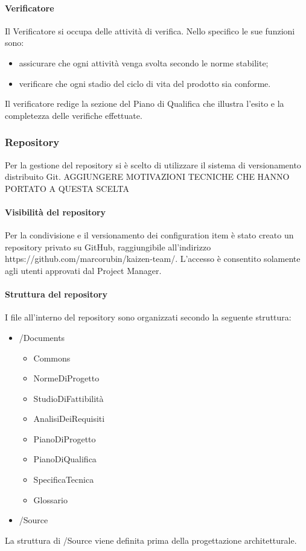 			\paragraph{Verificatore}
				Il Verificatore si occupa delle attività di verifica. Nello specifico le sue funzioni sono:
				\begin{itemize}
					\item assicurare che ogni attività venga svolta secondo le norme stabilite;
					\item verificare che ogni stadio del ciclo di vita del prodotto sia conforme.
				\end{itemize}
				Il verificatore redige la sezione del Piano di Qualifica che illustra l’esito e la completezza delle verifiche effettuate.
		\subsubsection{Repository}
			Per la gestione del repository si è scelto di utilizzare il sistema di versionamento distribuito Git. AGGIUNGERE MOTIVAZIONI TECNICHE CHE HANNO PORTATO A QUESTA SCELTA
			\paragraph{Visibilità del repository}
				Per la condivisione e il versionamento dei configuration item è stato creato un repository privato su GitHub, raggiungibile all’indirizzo https://github.com/marcorubin/kaizen-team/. L’accesso è consentito solamente agli utenti approvati dal Project Manager.
			\paragraph{Struttura del repository}
				I file all’interno del repository sono organizzati secondo la seguente struttura:
				\begin{itemize}
					\item /Documents
					\begin{itemize}
						\item Commons
						\item NormeDiProgetto
						\item StudioDiFattibilità
						\item AnalisiDeiRequisiti
						\item PianoDiProgetto
						\item PianoDiQualifica
						\item SpecificaTecnica
						\item Glossario
					\end{itemize}
					\item /Source
				\end{itemize}
				La struttura di /Source viene definita prima della progettazione architetturale.
